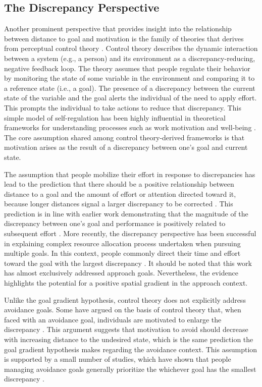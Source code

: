 \documentclass[a4paper,doc,natbib,donotrepeattitle]{apa6}
\begin{document}
\subsection{The Discrepancy Perspective}

Another prominent perspective that provides insight into the relationship between distance to goal and motivation is the family of theories that derives from perceptual control theory \citep[control theory, for short;][]{Powers1973,Powers1978}. Control theory describes the dynamic interaction between a system (e.g., a person) and its environment as a discrepancy-reducing, negative feedback loop. The theory assumes that people regulate their behavior by monitoring the state of some variable in the environment and comparing it to a reference state (i.e., a goal). The presence of a discrepancy between the current state of the variable and the goal alerts the individual of the need to apply effort. This prompts the individual to take actions to reduce that discrepancy. This simple model of self-regulation has been highly influential in theoretical frameworks for understanding processes such as work motivation \citep[e.g.,][]{Klein1989,Lord1994,Carver1990,Jagacinski2003} and well-being \citep{Higgins1997,Trew2011}. The core assumption shared among control theory-derived frameworks is that motivation arises as the result of a discrepancy between one's goal and current state.

The assumption that people mobilize their effort in response to discrepancies has lead to the prediction that there should be a positive relationship between distance to a goal and the amount of effort or attention directed toward it, because longer distances signal a larger discrepancy to be corrected \citep[e.g.,][]{Deshon2005,Unsworth2009}. This prediction is in line with earlier work demonstrating that the magnitude of the discrepancy between one's goal and performance is positively related to subsequent effort \citep{Kernan1990,Campion1982}. More recently, the discrepancy perspective has been successful in explaining complex resource allocation process undertaken when pursuing multiple goals. In this context, people commonly direct their time and effort toward the goal with the largest discrepancy \citep{Schmidt2007,Schmidt2009,Schmidt2009a,Ballard2016c}. It should be noted that this work has almost exclusively addressed approach goals. Nevertheless, the evidence highlights the potential for a positive spatial gradient in the approach context.

Unlike the goal gradient hypothesis, control theory does not explicitly address avoidance goals. Some have argued on the basis of control theory that, when faced with an avoidance goal, individuals are motivated to enlarge the discrepancy \citep[e.g.,][]{Carver1998,Ballard2016c}. This argument suggests that motivation to avoid should decrease with increasing distance to the undesired state, which is the same prediction the goal gradient hypothesis makes regarding the avoidance context. This assumption is supported by a small number of studies, which have shown that people managing avoidance goals generally prioritize the whichever goal has the smallest discrepancy \citep{Ballard2016c,Ballard2016b,Ballard2018}.
\end{document}
